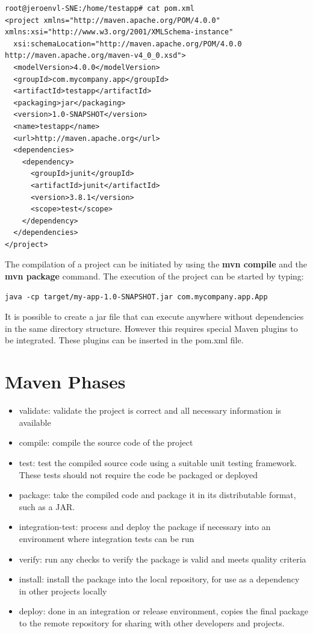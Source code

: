 \begin{verbatim}
root@jeroenvl-SNE:/home/testapp# cat pom.xml 
<project xmlns="http://maven.apache.org/POM/4.0.0" xmlns:xsi="http://www.w3.org/2001/XMLSchema-instance"
  xsi:schemaLocation="http://maven.apache.org/POM/4.0.0 http://maven.apache.org/maven-v4_0_0.xsd">
  <modelVersion>4.0.0</modelVersion>
  <groupId>com.mycompany.app</groupId>
  <artifactId>testapp</artifactId>
  <packaging>jar</packaging>
  <version>1.0-SNAPSHOT</version>
  <name>testapp</name>
  <url>http://maven.apache.org</url>
  <dependencies>
    <dependency>
      <groupId>junit</groupId>
      <artifactId>junit</artifactId>
      <version>3.8.1</version>
      <scope>test</scope>
    </dependency>
  </dependencies>
</project>
\end{verbatim}

The compilation of a project can be initiated by using the \textbf{mvn compile} and the \textbf{mvn package} command.
The execution of the project can be started by typing:

\begin{verbatim}
java -cp target/my-app-1.0-SNAPSHOT.jar com.mycompany.app.App 
\end{verbatim}

It is possible to create a jar file that can execute anywhere without dependencies in the same directory structure. However this requires special Maven plugins to be integrated. These plugins can be inserted in the pom.xml file.\newpage 

\section{Maven Phases}

\begin{itemize}
	\item validate: validate the project is correct and all necessary information is available
	\item compile: compile the source code of the project
	\item test: test the compiled source code using a suitable unit testing framework. These tests should not require the code be packaged or deployed
	\item package: take the compiled code and package it in its distributable format, such as a JAR.
	\item integration-test: process and deploy the package if necessary into an environment where integration tests can be run
	\item verify: run any checks to verify the package is valid and meets quality criteria
	\item install: install the package into the local repository, for use as a dependency in other projects locally
	\item deploy: done in an integration or release environment, copies the final package to the remote repository for sharing with other developers and projects.
\end{itemize}


